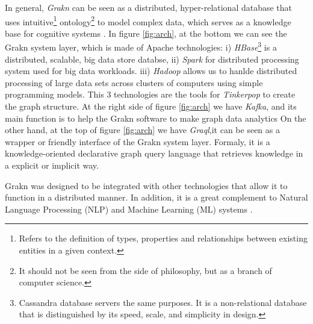 In general, \textit{Grakn} can be seen as a distributed, hyper-relational 
database that uses intuitive\footnote{Refers to the definition of types, 
properties and relationships between existing entities in a given context.} 
ontology\footnote{It should not be seen from the side of philosophy, but as a 
branch of computer science.}  to model complex data, which serves as a 
knowledge base for cognitive systems \cite{dbengines}. 
In figure \ref{fig:arch}, at the bottom we can see the Grakn system layer, 
which is made of Apache technologies: %
i) \textit{HBase}\footnote{Cassandra database servers the same purposes. It is 
a non-relational database that is distinguished by its speed, scale, 
and simplicity in design.} is a distributed, scalable, big data store databse, 
ii) \textit{Spark} for distributed processing system used for 
big data workloads.
iii) \textit{Hadoop} allows us to hanlde distributed processing of large data 
sets across clusters of computers using simple programming models.
This 3 technologies are the tools for \textit{Tinkerpop} to create the graph 
structure. At the right side of figure \ref{fig:arch} we have \textit{Kafka},
and its main function is to help the Grakn software to make graph data analytics
On the other hand, at the top of figure \ref{fig:arch} we have
\textit{Graql},it can be seen as a wrapper or friendly interface of the Grakn
system layer. Formaly, it is a knowledge-oriented declarative graph query 
language that retrieves knowledge in a explicit or implicit way.

Grakn was designed to be integrated with other technologies that allow it to 
function in a distributed manner. In addition, it is a great complement to 
Natural Language Processing (NLP) and Machine Learning (ML) systems 
\cite{grakn-youtube}.

